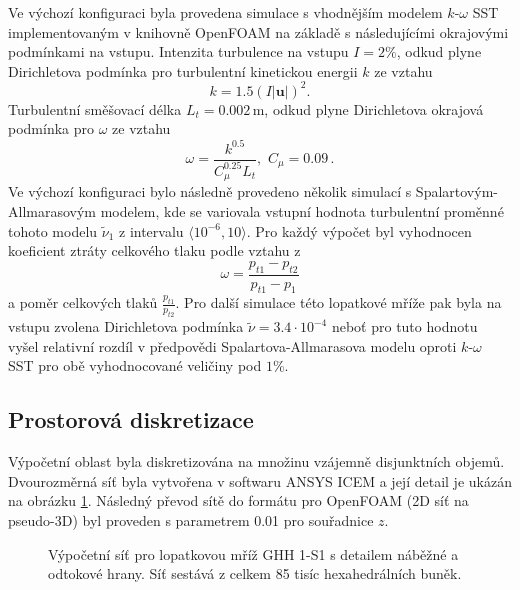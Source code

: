 Ve výchozí konfiguraci byla provedena simulace s vhodnějším modelem $k\text{-}\omega$ SST implementovaným v knihovně OpenFOAM na základě \cite{menter1994two, menter2003ten, rumsey2013menter} s následujícími okrajovými podmínkami na vstupu. Intenzita turbulence na vstupu $ I=2\% $, odkud plyne Dirichletova podmínka pro turbulentní kinetickou energii $ k $ ze vztahu  \begin{equation}
k=1.5(I|\mathbf{u}|)^2.
\end{equation} 
Turbulentní směšovací délka $ L_t=0.002\,\mathrm{m} $, odkud plyne Dirichletova okrajová podmínka pro $ \omega $ ze vztahu
\begin{equation}
\omega=\dfrac{k^{0.5}}{C_\mu^{0.25}L_t},\,\, C_\mu=0.09\,.
\end{equation} 
Ve výchozí konfiguraci bylo následně provedeno několik simulací s Spalartovým-Allmarasovým modelem, kde se variovala vstupní hodnota turbulentní proměnné tohoto modelu $ \tilde{\nu}_1 $ z intervalu $ \langle 10^{-6},10 \rangle $. Pro každý výpočet byl vyhodnocen koeficient ztráty celkového tlaku podle vztahu z \cite{steinert1990design}
\begin{equation}
\omega = \dfrac{p_{t1}-p_{t2}}{p_{t1}-p_1}
\end{equation}
a poměr celkových tlaků $ \frac{p_{t1}}{p_{t2}} $. Pro další simulace této lopatkové mříže pak byla na vstupu zvolena Dirichletova podmínka $ \tilde{\nu} = 3.4\cdot 10^{-4} $ neboť pro tuto hodnotu vyšel relativní rozdíl v předpovědi Spalartova-Allmarasova modelu oproti $k\text{-}\omega$ SST pro obě vyhodnocované veličiny pod $ 1\% $.

\subsection{Prostorová diskretizace}

Výpočetní oblast byla diskretizována na množinu vzájemně disjunktních objemů. Dvourozměrná síť byla vytvořena v softwaru ANSYS ICEM a její detail je ukázán na obrázku \ref{fig:ghs1_sit}. Následný převod sítě do formátu pro OpenFOAM (2D síť na pseudo-3D) byl proveden s parametrem 0.01 pro souřadnice $ z $.

\begin{figure}
	\centering
	\def\svgwidth{1\textwidth}
	\graphicspath{{img/inkscape/}}
	
	\caption[Výpočetní síť mříže GHH 1-S1]{Výpočetní síť pro lopatkovou mříž GHH 1-S1 s detailem náběžné a odtokové hrany. Síť sestává z celkem 85 tisíc hexahedrálních buněk. }
	\label{fig:ghs1_sit}
\end{figure}

